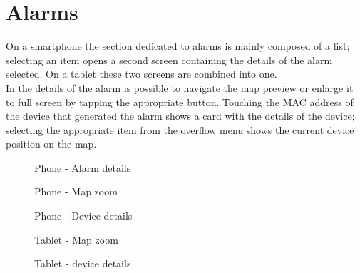 


\chapter{Alarms}
On a smartphone the section dedicated to alarms is mainly composed of a list; selecting an item opens a second screen containing the details of the alarm selected. On a tablet these two screens are combined into one. \\ 
In the details of the alarm is possible to navigate the map preview or enlarge it to full screen by tapping the appropriate button. Touching the MAC address of the device that generated the alarm shows a card with the details of the device; selecting the appropriate item from the overflow menu shows the current device position on the map.

	\begin{figure}[h!]
		  \centering
		  \caption{Phone - Alarm details}
	\end{figure}

	\begin{figure}[h!]
		  \centering
		  \caption{Phone - Map zoom}
	\end{figure}

	\begin{figure}[h!]
		  \centering
		  \caption{Phone - Device details}
	\end{figure}

	\begin{figure}[h!]
		  \centering
		  \caption{Tablet - Map zoom}
	\end{figure}

	\begin{figure}[h!]
		  \centering
		  \caption{Tablet - device details}
	\end{figure}